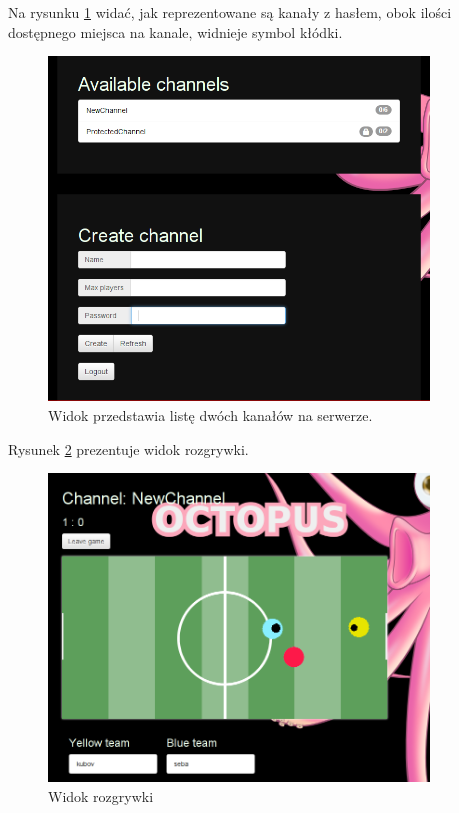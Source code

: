 Na rysunku \ref{fig:chans} widać, jak reprezentowane są kanały z hasłem, obok ilości dostępnego miejsca na kanale, widnieje symbol kłódki.
\begin{figure}[ht]
    \centering
    \includegraphics[width=0.9\textwidth]{imgs/twoChannels.png}
    \caption{Widok przedstawia listę dwóch kanałów na serwerze.}
    \label{fig:chans}
\end{figure}

Rysunek \ref{fig:game} prezentuje widok rozgrywki.
\begin{figure}[ht]
    \centering
    \includegraphics[width=0.9\textwidth]{imgs/gameView.png}
    \caption{Widok rozgrywki}
    \label{fig:game}
\end{figure}


